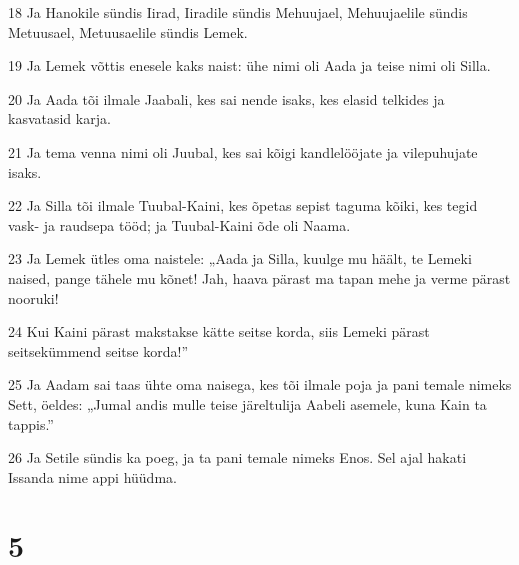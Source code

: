 \par 18 Ja Hanokile sündis Iirad, Iiradile sündis Mehuujael, Mehuujaelile sündis Metuusael, Metuusaelile sündis Lemek.
\par 19 Ja Lemek võttis enesele kaks naist: ühe nimi oli Aada ja teise nimi oli Silla.
\par 20 Ja Aada tõi ilmale Jaabali, kes sai nende isaks, kes elasid telkides ja kasvatasid karja.
\par 21 Ja tema venna nimi oli Juubal, kes sai kõigi kandlelööjate ja vilepuhujate isaks.
\par 22 Ja Silla tõi ilmale Tuubal-Kaini, kes õpetas sepist taguma kõiki, kes tegid vask- ja raudsepa tööd; ja Tuubal-Kaini õde oli Naama.
\par 23 Ja Lemek ütles oma naistele: „Aada ja Silla, kuulge mu häält, te Lemeki naised, pange tähele mu kõnet! Jah, haava pärast ma tapan mehe ja verme pärast nooruki!
\par 24 Kui Kaini pärast makstakse kätte seitse korda, siis Lemeki pärast seitsekümmend seitse korda!”
\par 25 Ja Aadam sai taas ühte oma naisega, kes tõi ilmale poja ja pani temale nimeks Sett, öeldes: „Jumal andis mulle teise järeltulija Aabeli asemele, kuna Kain ta tappis.”
\par 26 Ja Setile sündis ka poeg, ja ta pani temale nimeks Enos. Sel ajal hakati Issanda nime appi hüüdma.

\chapter{5}

